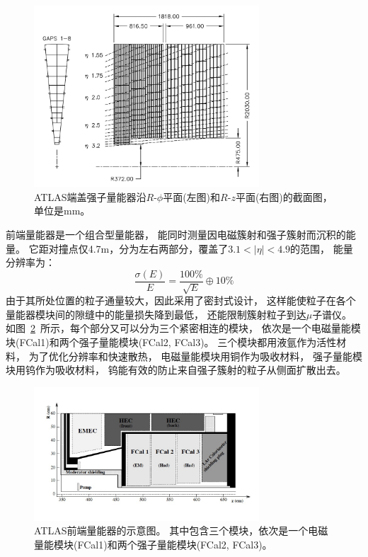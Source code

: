 \begin{figure}
  \begin{center}
    \includegraphics[width=0.75\textwidth]{figuresEXP/ATLASCA4.jpg}
  \end{center}
  \caption{
ATLAS端盖强子量能器沿$R$-$\phi$平面(左图)和$R$-$z$平面(右图)的截面图，单位是mm。
  }
    \label{fig:ATLASCA4}
\end{figure}

前端量能器是一个组合型量能器，
能同时测量因电磁簇射和强子簇射而沉积的能量。
它距对撞点仅4.7m，分为左右两部分，覆盖了$3.1<|\eta|<4.9$的范围，
能量分辨率为：
\begin{equation} 
\label{eq:EMsigma3}
\frac{\sigma(E)}{E}=\frac{100\%}{\sqrt{E}}\oplus 10\%
\end{equation}
由于其所处位置的粒子通量较大，因此采用了密封式设计，
这样能使粒子在各个量能器模块间的隙缝中的能量损失降到最低，
还能限制簇射粒子到达$\mu$子谱仪。
如图~\ref{fig:ATLASCA5}~所示，每个部分又可以分为三个紧密相连的模块，
依次是一个电磁量能模块(FCal1)和两个强子量能模块(FCal2, FCal3)。
三个模块都用液氩作为活性材料，
为了优化分辨率和快速散热，
电磁量能模块用铜作为吸收材料，
强子量能模块用钨作为吸收材料，
钨能有效的防止来自强子簇射的粒子从侧面扩散出去。

\begin{figure}
  \begin{center}
    \includegraphics[width=0.75\textwidth]{figuresEXP/ATLASCA5.jpg}
  \end{center}
  \caption{
ATLAS前端量能器的示意图。
其中包含三个模块，依次是一个电磁量能模块(FCal1)和两个强子量能模块(FCal2, FCal3)。
  }
    \label{fig:ATLASCA5}
\end{figure}





